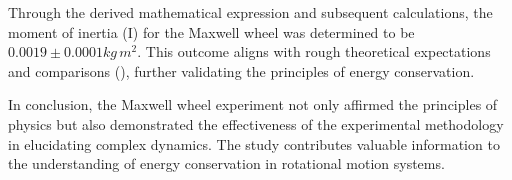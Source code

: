 \documentclass{article}
\begin{document}
Through the derived mathematical expression and subsequent calculations, the moment of inertia (I) for the Maxwell wheel was determined to be $0.0019\pm0.0001kg\,m^2$. This outcome aligns with rough theoretical expectations and comparisons (\cite{listofmomentofinertia,experimentalvalue}), further validating the principles of energy conservation.

In conclusion, the Maxwell wheel experiment not only affirmed the principles of physics but also demonstrated the effectiveness of the experimental methodology in elucidating complex dynamics. The study contributes valuable information to the understanding of energy conservation in rotational motion systems.


\pagebreak


\pagebreak

\end{document}
